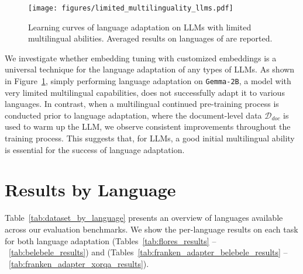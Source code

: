 \begin{figure}[t]
    \setlength{\abovecaptionskip}{-0.0001cm}
    \setlength{\belowcaptionskip}{-0.35cm}
    \centering
    \texttt{[image: figures/limited\_multilinguality\_llms.pdf]}
    \vspace{-8mm}
    \caption{Learning curves of language adaptation on LLMs with limited multilingual abilities. Averaged results on \sea languages of \flores are reported.}
    \vspace{-6mm}
    \label{fig:limited_multilinguality_llms}
\end{figure}

We investigate whether embedding tuning with customized embeddings is a universal technique for the language adaptation of any types of LLMs. As shown in Figure~\ref{fig:limited_multilinguality_llms}, simply performing language adaptation on \texttt{Gemma-2B}, a model with very limited multilingual capabilities, does not successfully adapt it to various languages. In contrast, when a multilingual continued pre-training process is conducted prior to language adaptation, where the document-level data $\mathcal{D}_{doc}$ is used to warm up the LLM, we observe consistent improvements throughout the training process. This suggests that, for LLMs, a good initial multilingual ability is essential for the success of language adaptation.


\section{Results by Language}\label{appendix:detailed_lang_results}
Table~\ref{tab:dataset_by_language} presents an overview of languages available across our evaluation benchmarks. We show the per-language results on each task for both language adaptation
(Tables~\ref{tab:flores_results} --~\ref{tab:belebele_results})
and \ouradapter (Tables~\ref{tab:franken_adapter_belebele_results} --~\ref{tab:franken_adapter_xorqa_results}).


\onecolumn














